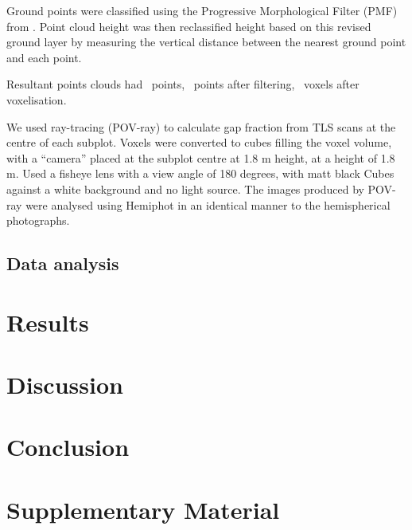 \documentclass[11pt,a4paper]{article}
\newcommand{\beginsupplement}{%
	\setcounter{table}{0}
	\renewcommand{\thetable}{S\arabic{table}}%
	\setcounter{figure}{0}
	\renewcommand{\thefigure}{S\arabic{figure}}%
}
\begin{document}
Ground points were classified using the Progressive Morphological Filter (PMF) from \citep{Zhang2003}. Point cloud height was then reclassified height based on this revised ground layer by measuring the vertical distance between the nearest ground point and each point.

Resultant points clouds had ~points, ~points after filtering, ~voxels after voxelisation.

We used ray-tracing (POV-ray) to calculate gap fraction from TLS scans at the centre of each subplot. Voxels were converted to cubes filling the voxel volume, with a ``camera'' placed at the subplot centre at 1.8 m height, at a height of 1.8 m. Used a fisheye lens with a view angle of 180 degrees, with matt black Cubes against a white background and no light source. The images produced by POV-ray were analysed using Hemiphot in an identical manner to the hemispherical photographs.

\subsection{Data analysis}

\section{Results}

\section{Discussion}

\section{Conclusion}

\printbibliography

\section{Supplementary Material} \beginsupplement
\end{document}
